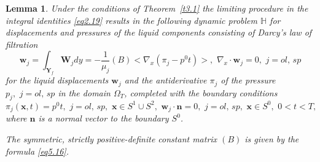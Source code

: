 \documentclass[10pt,a4paper]{amsart}
\newtheorem{lemma}{Lemma}
\begin{document}
\begin{lemma}\label{l5.3}
Under the conditions of Theorem~\ref{t3.1} the limiting procedure in the integral identities \eqref{eq2.19} results in the following dynamic problem $\mathbb{H}$ for displacements and pressures of the liquid components consisting of Darcy's law of filtration
\begin{equation}\label{eq5.3}
\boldsymbol{w}_{j}=\int_{\textbf{Y}_{f}}\boldsymbol{W}_{j}dy=
-\frac{1}{\mu_{j}}(B)<\nabla_{x}({\pi}_{j}-{p}^{0}t)>,\,\,
\nabla_{x}\cdot\boldsymbol{w}_{j}=0,\,\,j=ol,\,sp
\end{equation}
for the liquid displacements $\boldsymbol{w}_{j}$ and the antiderivative ${\pi}_{j}$ of the pressure ${p}_{j},\,\,j=ol,\,sp$ in the domain $\Omega_{T}$, completed with the boundary conditions
\begin{equation}\label{eq5.4}
{\pi}_{j}(\boldsymbol{x},t)={p}^{0}t,\,\,j=ol,\,sp,\,\,\boldsymbol{x}\in{S}^{1}\cup{S}^{2},\,\,
\boldsymbol{w}_{j}\cdot\boldsymbol{n}=0,\,\,j=ol,\,sp,\,\,\boldsymbol{x}\in{S}^{0},\,\,0<t<T,
\end{equation}
where $\boldsymbol{n}$ is a normal vector to the boundary ${S}^{0}$.

The symmetric, strictly positive-definite constant matrix $(B)$ is given by the formula \eqref{eq5.16}.
\end{lemma}
\end{document}

